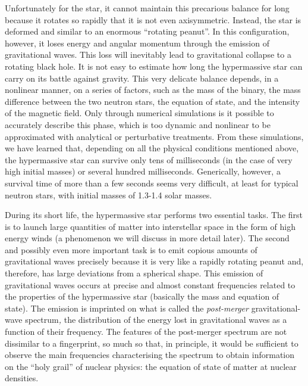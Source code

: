 Unfortunately for the star, it cannot maintain this precarious balance for long because
it rotates so rapidly that it is not even axisymmetric. Instead, the star is deformed
and similar to an enormous ``rotating peanut''. In this configuration, however, it loses
energy and angular momentum through the emission of gravitational waves. This loss will
inevitably lead to gravitational collapse to a rotating black hole.
It is not easy to estimate how long the hypermassive star can carry on its battle
against gravity. This very delicate balance depends, in a nonlinear manner, on a series
of factors, such as the mass of the binary, the mass difference between the two neutron
stars, the equation of state, and the intensity of the magnetic field. Only through
numerical simulations is it possible to accurately describe this phase, which is too
dynamic and nonlinear to be approximated with analytical or perturbative treatments.
From these simulations, we have learned that, depending on all the physical conditions
mentioned above, the hypermassive star can survive only tens of milliseconds (in the
case of very high initial masses) or several hundred milliseconds. Generically, however,
a survival time of more than a few seconds seems very difficult, at least for typical
neutron stars, with initial masses of 1.3-1.4 solar masses.

During its short life, the hypermassive star performs two essential tasks. The first is
to launch large quantities of matter into interstellar space in the form of high energy
winds (a phenomenon we will discuss in more detail later). The second and possibly even
more important task is to emit copious amounts of gravitational waves precisely because
it is very like a rapidly rotating peanut and, therefore, has large deviations from a
spherical shape. This emission of gravitational waves occurs at precise and almost
constant frequencies related to the properties of the hypermassive star (basically the
mass and equation of state). The emission is imprinted on what is called the
\emph{post-merger} gravitational-wave
spectrum\emph{,} the distribution of the energy lost in gravitational
waves as a function of their frequency. The features of the post-merger spectrum are not
dissimilar to a fingerprint, so much so that, in principle, it would be sufficient to
observe the main frequencies characterising the spectrum to obtain information on the
``holy grail'' of nuclear physics: the equation of state of matter at nuclear
densities.

